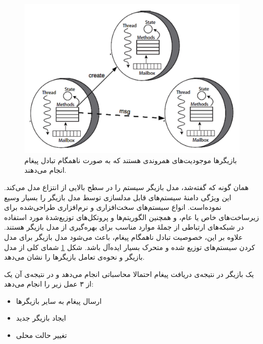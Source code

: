 \begin{figure}
    \begin{center}
	\includegraphics[width=12cm]{2-Preliminaries/Figures/Actor_Structure.pdf}
    \end{center}
    \caption{\label{fig:actorStructure} بازیگر‌ها موجودیت‌های همروندی هستند که به صورت ناهمگام تبادل پیغام انجام ‌می‌دهند. }
\end{figure}


همان گونه که گفته‌شد، مدل بازیگر سیستم را در سطح بالایی از انتزاع مدل می‌کند.
این ویژگی دامنهٔ سیستم‌های قابل مدلسازی توسط مدل بازیگر را بسیار وسیع نموده‌است.
انواع سیستم‌های سخت‌افزاری و نرم‌افزاری طراحی‌شده برای زیرساخت‌های خاص یا عام، و همچنین الگوریتم‌ها و پروتکل‌های توزیع‌شدهٔ مورد استفاده در شبکه‌های ارتباطی از جملهٔ موارد مناسب برای بهره‌گیری از مدل بازیگر هستند. علاوه بر این، خصوصیت تبادل ناهمگام پیغام، باعث می‌شود مدل بازیگر برای مدل کردن سیستم‌های توزیع شده و متحرک بسیار ایده‌آل باشد\cite{KarmaniAgha_Actors_11}. شکل \ref{fig:actorStructure} شمای کلی از مدل بازیگر و نحوه‌ی تعامل بازیگر‌ها را نشان می‌دهد.
 
 یک بازیگر در نتیجه‌ی دریافت پیغام احتمالا محاسباتی انجام می‌دهد و در نتیجه‌ی آن یک از ۳ عمل زیر را انجام می‌دهد:
\begin{itemize}
\item ارسال پیغام به سایر بازیگر‌ها
\item ایجاد بازیگر جدید
\item تغییر حالت محلی
\end{itemize} 

